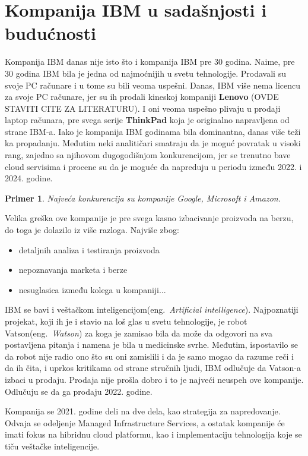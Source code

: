 \documentclass[a4paper]{article}
\newtheorem{primer}{Primer}[section]
\begin{document}
\section{Kompanija IBM u sadašnjosti i budućnosti}
Kompanija IBM danas nije isto što i kompanija IBM pre 30 godina. Naime, pre 30 godina IBM bila je jedna od najmoćnijih u svetu tehnologije. Prodavali su svoje PC računare i u tome su bili veoma uspešni.
Danas, IBM više nema licencu za svoje PC računare, jer su ih prodali kineskoj kompaniji \textbf{Lenovo} (OVDE STAVITI CITE ZA LITERATURU). I oni veoma uspešno plivaju u prodaji laptop računara, pre svega serije \textbf{ThinkPad} koja je originalno napravljena od strane IBM-a. Iako je kompanija IBM godinama bila dominantna, danas više teži ka propadanju. Međutim neki analitičari smatraju da je moguć povratak u visoki rang, zajedno sa njihovom dugogodišnjom konkurencijom, jer se trenutno bave cloud servisima i procene su da je moguće da napreduju u periodu između 2022. i 2024. godine.

\begin{primer}
Najveća konkurencija su kompanije Google, Microsoft i Amazon.
\end{primer}

Velika greška ove kompanije je pre svega kasno izbacivanje proizvoda na berzu, do toga je dolazilo iz više razloga. Najviše zbog:

\begin{itemize}
\item detaljnih analiza i testiranja proizvoda
\item nepoznavanja marketa i berze
\item nesuglasica između kolega u kompaniji...
\end{itemize}

IBM se bavi i veštačkom inteligencijom(eng.~{\em Artificial intelligence}). Najpoznatiji projekat, koji ih je i stavio na loš glas u svetu tehnologije, je robot Vatson(eng.~{\em Watson}) za koga je zamisao bila da može da odgovori na sva postavljena pitanja i namena je bila u medicinske svrhe. Međutim, ispostavilo se da robot nije radio ono što su oni zamislili i da je samo mogao da razume reči i da ih čita, i uprkos kritikama od strane stručnih ljudi, IBM odlučuje da Vatson-a izbaci u prodaju. Prodaja nije prošla dobro i to je najveći neuspeh ove kompanije. Odlučuju se da ga prodaju 2022. godine.

Kompanija se 2021. godine deli na dve dela, kao strategija za napredovanje. Odvaja se odeljenje Managed Infrastructure Services, a ostatak kompanije će imati fokus na hibridnu cloud platformu, kao i implementaciju tehnologija koje se tiču veštačke inteligencije.
\end{document}
